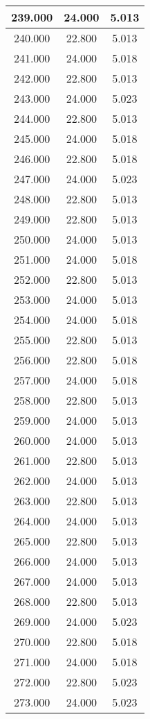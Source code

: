\documentclass[11pt,a4paper]{jsarticle}
\begin{document}
\begin{center}
\begin{longtable}{|c|c|c|}
239.000	 & 24.000&  5.013 \\ \hline
240.000	 & 22.800&  5.013 \\ \hline
241.000	 & 24.000&  5.018 \\ \hline
242.000	 & 22.800&  5.013 \\ \hline
243.000	 & 24.000&  5.023 \\ \hline
244.000	 & 22.800&  5.013 \\ \hline
245.000	 & 24.000&  5.018 \\ \hline
246.000	 & 22.800&  5.018 \\ \hline
247.000	 & 24.000&  5.023 \\ \hline
248.000	 & 22.800&  5.013 \\ \hline
249.000	 & 22.800&  5.013 \\ \hline
250.000	 & 24.000&  5.013 \\ \hline
251.000	 & 24.000&  5.018 \\ \hline
252.000	 & 22.800&  5.013 \\ \hline
253.000	 & 24.000&  5.013 \\ \hline
254.000	 & 24.000&  5.018 \\ \hline
255.000	 & 22.800&  5.013 \\ \hline
256.000	 & 22.800&  5.018 \\ \hline
257.000	 & 24.000&  5.018 \\ \hline
258.000	 & 22.800&  5.013 \\ \hline
259.000	 & 24.000&  5.013 \\ \hline
260.000	 & 24.000&  5.013 \\ \hline
261.000	 & 22.800&  5.013 \\ \hline
262.000	 & 24.000&  5.013 \\ \hline
263.000	 & 22.800&  5.013 \\ \hline
264.000	 & 24.000&  5.013 \\ \hline
265.000	 & 22.800&  5.013 \\ \hline
266.000	 & 24.000&  5.013 \\ \hline
267.000	 & 24.000&  5.013 \\ \hline
268.000	 & 22.800&  5.013 \\ \hline
269.000	 & 24.000&  5.023 \\ \hline
270.000	 & 22.800&  5.018 \\ \hline
271.000	 & 24.000&  5.018 \\ \hline
272.000	 & 22.800&  5.023 \\ \hline
273.000	 & 24.000&  5.023 \\ \hline

\end{longtable}
\end{center}
\end{document}
